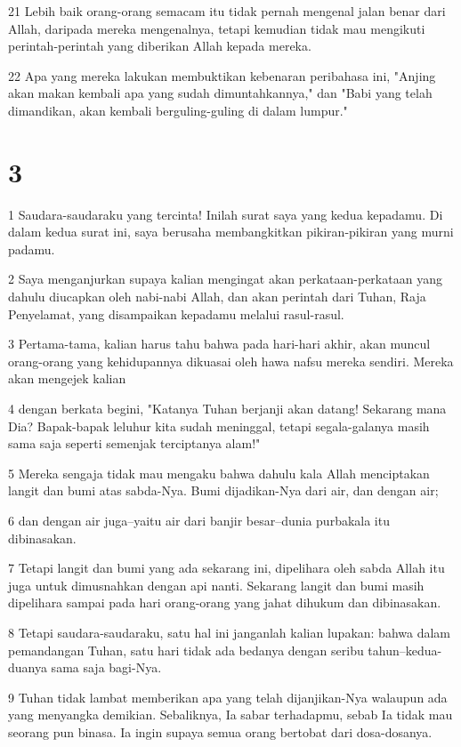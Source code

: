 \par 21 Lebih baik orang-orang semacam itu tidak pernah mengenal jalan benar dari Allah, daripada mereka mengenalnya, tetapi kemudian tidak mau mengikuti perintah-perintah yang diberikan Allah kepada mereka.
\par 22 Apa yang mereka lakukan membuktikan kebenaran peribahasa ini, "Anjing akan makan kembali apa yang sudah dimuntahkannya," dan "Babi yang telah dimandikan, akan kembali berguling-guling di dalam lumpur."

\chapter{3}

\par 1 Saudara-saudaraku yang tercinta! Inilah surat saya yang kedua kepadamu. Di dalam kedua surat ini, saya berusaha membangkitkan pikiran-pikiran yang murni padamu.
\par 2 Saya menganjurkan supaya kalian mengingat akan perkataan-perkataan yang dahulu diucapkan oleh nabi-nabi Allah, dan akan perintah dari Tuhan, Raja Penyelamat, yang disampaikan kepadamu melalui rasul-rasul.
\par 3 Pertama-tama, kalian harus tahu bahwa pada hari-hari akhir, akan muncul orang-orang yang kehidupannya dikuasai oleh hawa nafsu mereka sendiri. Mereka akan mengejek kalian
\par 4 dengan berkata begini, "Katanya Tuhan berjanji akan datang! Sekarang mana Dia? Bapak-bapak leluhur kita sudah meninggal, tetapi segala-galanya masih sama saja seperti semenjak terciptanya alam!"
\par 5 Mereka sengaja tidak mau mengaku bahwa dahulu kala Allah menciptakan langit dan bumi atas sabda-Nya. Bumi dijadikan-Nya dari air, dan dengan air;
\par 6 dan dengan air juga--yaitu air dari banjir besar--dunia purbakala itu dibinasakan.
\par 7 Tetapi langit dan bumi yang ada sekarang ini, dipelihara oleh sabda Allah itu juga untuk dimusnahkan dengan api nanti. Sekarang langit dan bumi masih dipelihara sampai pada hari orang-orang yang jahat dihukum dan dibinasakan.
\par 8 Tetapi saudara-saudaraku, satu hal ini janganlah kalian lupakan: bahwa dalam pemandangan Tuhan, satu hari tidak ada bedanya dengan seribu tahun--kedua-duanya sama saja bagi-Nya.
\par 9 Tuhan tidak lambat memberikan apa yang telah dijanjikan-Nya walaupun ada yang menyangka demikian. Sebaliknya, Ia sabar terhadapmu, sebab Ia tidak mau seorang pun binasa. Ia ingin supaya semua orang bertobat dari dosa-dosanya.
